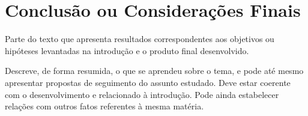 \chapter{Conclusão ou Considerações Finais}

Parte do texto que apresenta resultados correspondentes aos objetivos ou 
hipóteses levantadas na introdução e o produto final desenvolvido. 

Descreve, de forma resumida, o que se aprendeu sobre o tema, e pode até 
mesmo apresentar propostas de seguimento do assunto estudado. Deve estar 
coerente com o desenvolvimento e relacionado à introdução. Pode ainda estabelecer 
relações com outros fatos referentes à mesma matéria. 